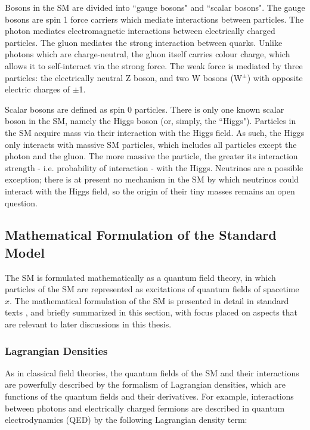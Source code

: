 Bosons in the SM are divided into ``gauge bosons" and ``scalar bosons". The gauge bosons are spin 1 force carriers which mediate interactions between particles. The photon mediates electromagnetic interactions between electrically charged particles. The gluon mediates the strong interaction between quarks. Unlike photons which are charge-neutral, the gluon itself carries colour charge, which allows it to self-interact via the strong force. The weak force is mediated by three particles: the electrically neutral Z boson, and two W bosons (W$^\pm$) with opposite electric charges of $\pm$1. 

Scalar bosons are defined as spin 0 particles. There is only one known scalar boson in the SM, namely the Higgs boson (or, simply, the ``Higgs"). Particles in the SM acquire mass via their interaction with the Higgs field. As such, the Higgs only interacts with massive SM particles, which includes all particles except the photon and the gluon. The more massive the particle, the greater its interaction strength - i.e. probability of interaction - with the Higgs. Neutrinos are a possible exception; there is at present no mechanism in the SM by which neutrinos could interact with the Higgs field, so the origin of their tiny masses remains an open question.  

\subsection{Mathematical Formulation of the Standard Model}

The SM is formulated mathematically as a quantum field theory, in which particles of the SM are represented as excitations of quantum fields of spacetime \(x\). The mathematical formulation of the SM is presented in detail in standard texts \cite{Griffiths_2008, SM_intro}, and briefly summarized in this section, with focus placed on aspects that are relevant to later discussions in this thesis.

\subsubsection{Lagrangian Densities}

As in classical field theories, the quantum fields of the SM and their interactions are powerfully described by the formalism of Lagrangian densities, which are functions of the quantum fields and their derivatives. For example, interactions between photons and electrically charged fermions are described in quantum electrodynamics (QED) by the following Lagrangian density term:

